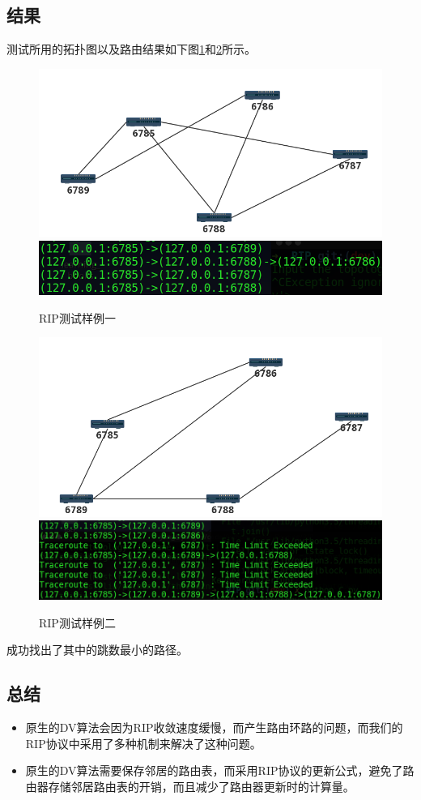 	\subsection{结果} %
	\label{sub:结果}
		测试所用的拓扑图以及路由结果如下图\ref{fig:ripTest1}和\ref{fig:ripTest2}所示。
		\begin{figure}[H]
			\centering
			\includegraphics[scale=0.4]{imgs/topo1/tpop1.png}
			\includegraphics[scale=0.5]{imgs/ripTest1.PNG}
			\caption{RIP测试样例一}
			\label{fig:ripTest1}
		\end{figure}
		\begin{figure}[H]
			\centering
			\includegraphics[scale=0.4]{imgs/topo1/topo2.png}
			\includegraphics[scale=0.4]{imgs/ripTest2.PNG}
			\caption{RIP测试样例二}
			\label{fig:ripTest2}
		\end{figure}
		成功找出了其中的跳数最小的路径。
	\subsection{总结} %
	\label{sub:总结}
		\begin{itemize}
			\item 原生的DV算法会因为RIP收敛速度缓慢，而产生路由环路的问题，而我们的RIP协议中采用了多种机制来解决了这种问题。
			\item 原生的DV算法需要保存邻居的路由表，而采用RIP协议的更新公式，避免了路由器存储邻居路由表的开销，而且减少了路由器更新时的计算量。
		\end{itemize}
	


